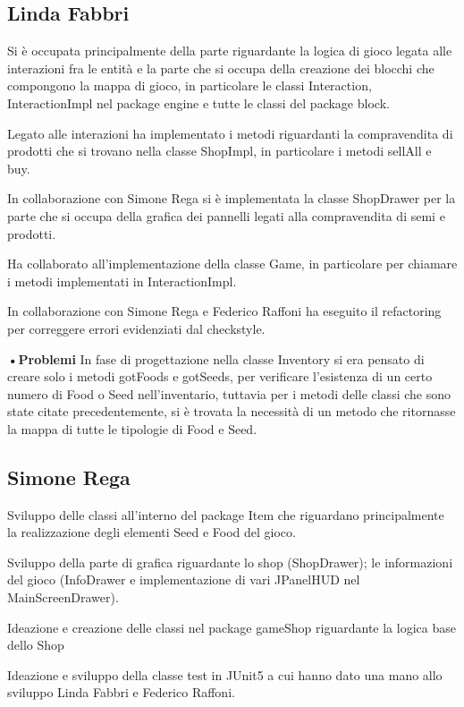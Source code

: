\documentclass[a4paper,12pt]{report}
\begin{document}
\subsection{Linda Fabbri}

Si è occupata principalmente della parte riguardante la logica di gioco legata alle interazioni fra le entità e la parte che si occupa della creazione dei blocchi che compongono la mappa di gioco, in particolare le classi Interaction, InteractionImpl nel package engine e tutte le classi del package block. 

Legato alle interazioni ha implementato i metodi riguardanti la compravendita di prodotti che si trovano nella classe ShopImpl, in particolare i metodi sellAll e buy. 

In collaborazione con Simone Rega si è implementata la classe ShopDrawer per la parte che si occupa della grafica dei pannelli legati alla compravendita di semi e prodotti. 

Ha collaborato all’implementazione della classe Game, in particolare per chiamare i metodi implementati in InteractionImpl. 

In collaborazione con Simone Rega e Federico Raffoni ha eseguito il refactoring per correggere errori evidenziati dal checkstyle.

\hfill\break
\textbf{•Problemi}\hfill\break
In fase di progettazione nella classe Inventory si era pensato di creare solo i metodi gotFoods e gotSeeds, per verificare l’esistenza di un certo numero di Food o Seed nell’inventario, tuttavia per i metodi delle classi che sono state citate precedentemente, si è trovata la necessità di un metodo che ritornasse la mappa di tutte le tipologie di Food e Seed.

\subsection{Simone Rega}
Sviluppo delle classi all'interno del package Item che riguardano principalmente la realizzazione degli elementi Seed e Food del gioco.

Sviluppo della parte di grafica riguardante lo shop (ShopDrawer); le informazioni del gioco (InfoDrawer e implementazione di vari JPanelHUD nel MainScreenDrawer).

Ideazione e creazione delle classi nel package gameShop riguardante la logica base dello Shop

Ideazione e sviluppo della classe test in JUnit5 a cui hanno dato una mano allo sviluppo Linda Fabbri e Federico Raffoni.
\end{document}
